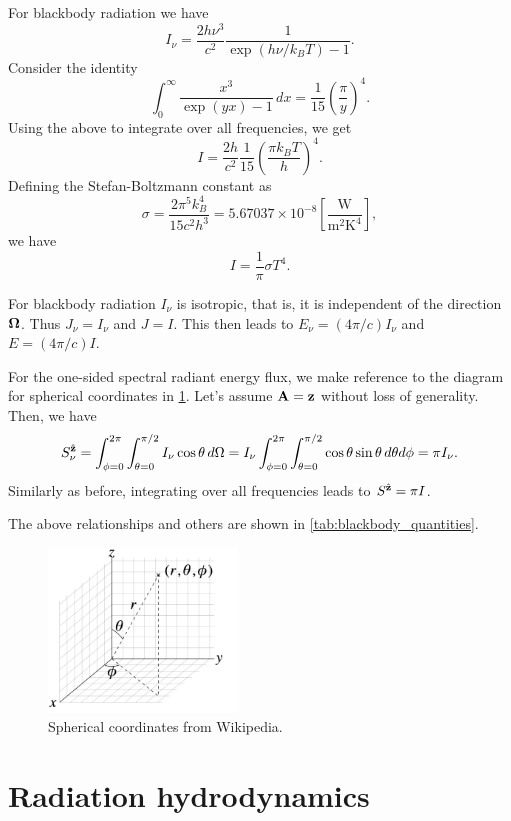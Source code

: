 \documentclass[a4paper,11pt]{article}
\begin{document}
For blackbody radiation we have
\begin{equation}
    I_\nu = \frac{2h\nu^3}{c^2} \frac{1}{\exp(h\nu/k_BT) - 1}.
\end{equation}
Consider the identity 
\begin{equation}
    \int_0^\infty \frac{x^3}{\exp(yx) - 1} \, dx = \frac{1}{15} \left ( \frac{\pi}{y} \right )^4.
\end{equation}
Using the above to integrate over all frequencies, we get
\begin{equation}
    I = \frac{2h}{c^2} \frac{1}{15} \left ( \frac{ \pi k_BT}{h} \right )^4.
\end{equation}
Defining the Stefan-Boltzmann constant as
\begin{equation}
    \sigma = \frac{2 \pi^5 k_B^4}{15 c^2 h^3} = 5.67037 \times 10^{-8} \left [ \frac{\text{W}}{\text{m}^2 \text{K}^4} \right ],
\end{equation}
we have
\begin{equation}
    I = \frac{1}{\pi} \sigma T^4.
\end{equation}

For blackbody radiation $I_\nu$ is isotropic, that is, it is independent of the direction $\bm \Omega$. Thus $J_\nu = I_\nu$ and $J = I$. This then leads to $E_\nu = (4\pi/c) I_\nu$ and  $E = (4\pi/c) I$.
    
For the one-sided spectral radiant energy flux, we make reference to the diagram for spherical coordinates in \cref{fig:spherical_coordinates}. Let's assume $\mathbf{A} = \mathbf{z}$ without loss of generality. Then, we have
\begin{equation}
    S_\nu^{\hat{\mathbf{z}}} = \int_{\phi = 0}^{2\pi} \int_{\theta=0}^{\pi/2} I_\nu \cos \theta \, d\Omega = I_\nu \int_{\phi = 0}^{2\pi} \int_{\theta=0}^{\pi/2} \cos \theta \sin \theta \, d\theta d\phi = \pi I_\nu.
\end{equation}
Similarly as before, integrating over all frequencies leads to $S^{\hat{\mathbf{z}}} = \pi I$.
    
The above relationships and others are shown in \cref{tab:blackbody_quantities}. 

\begin{figure}[ht]
    \centering
    \includegraphics[width=5cm]{../../images/spherical_coords_wiki.png}
    \caption{Spherical coordinates from Wikipedia.}
    \label{fig:spherical_coordinates}
\end{figure}

\section{Radiation hydrodynamics}
\end{document}
